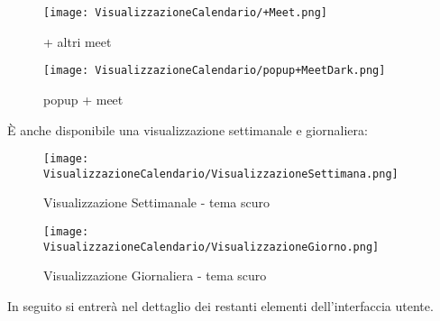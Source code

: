 \begin{figure}[H]
    \centering
    \begin{minipage}{0.45\textwidth}
        \centering
        \texttt{[image: VisualizzazioneCalendario/+Meet.png]}
        \caption{+ altri meet}
    \end{minipage}
    \hspace{0.05\textwidth}
    \begin{minipage}{0.45\textwidth}
        \centering
        \texttt{[image: VisualizzazioneCalendario/popup+MeetDark.png]}
        \caption{popup + meet}
    \end{minipage}
\end{figure}
\clearpage
\noindent È anche disponibile una visualizzazione settimanale e giornaliera:
\begin{figure}[H]
    \centering
    \texttt{[image: VisualizzazioneCalendario/VisualizzazioneSettimana.png]}
    \caption{Visualizzazione Settimanale - tema scuro}
\end{figure}
\begin{figure}[H]
    \centering
    \texttt{[image: VisualizzazioneCalendario/VisualizzazioneGiorno.png]}
    \caption{Visualizzazione Giornaliera - tema scuro}
\end{figure}
\noindent In seguito si entrerà nel dettaglio dei restanti elementi dell'interfaccia utente.